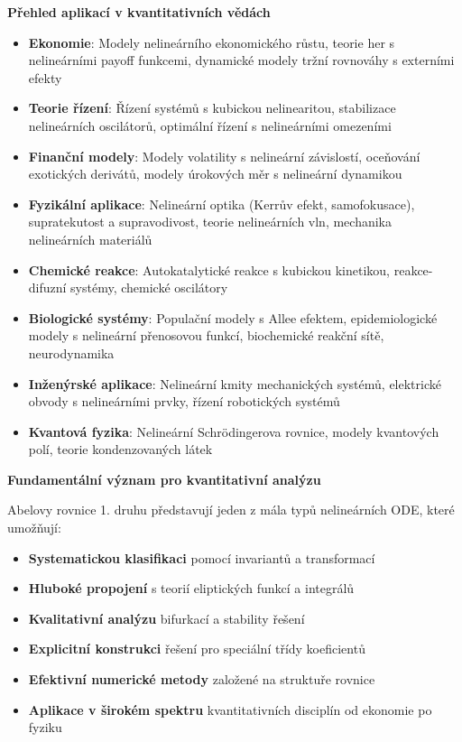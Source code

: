 \vspace{1\baselineskip}

\noindent\textbf{Přehled aplikací v kvantitativních vědách}

\begin{itemize}
\item \textbf{Ekonomie}: Modely nelineárního ekonomického růstu, teorie her s nelineárními payoff funkcemi, dynamické modely tržní rovnováhy s externími efekty
\item \textbf{Teorie řízení}: Řízení systémů s kubickou nelinearitou, stabilizace nelineárních oscilátorů, optimální řízení s nelineárními omezeními
\item \textbf{Finanční modely}: Modely volatility s nelineární závislostí, oceňování exotických derivátů, modely úrokových měr s nelineární dynamikou
\item \textbf{Fyzikální aplikace}: Nelineární optika (Kerrův efekt, samofokusace), supratekutost a supravodivost, teorie nelineárních vln, mechanika nelineárních materiálů
\item \textbf{Chemické reakce}: Autokatalytické reakce s kubickou kinetikou, reakce-difuzní systémy, chemické oscilátory
\item \textbf{Biologické systémy}: Populační modely s Allee efektem, epidemiologické modely s nelineární přenosovou funkcí, biochemické reakční sítě, neurodynamika
\item \textbf{Inženýrské aplikace}: Nelineární kmity mechanických systémů, elektrické obvody s nelineárními prvky, řízení robotických systémů
\item \textbf{Kvantová fyzika}: Nelineární Schrödingerova rovnice, modely kvantových polí, teorie kondenzovaných látek
\end{itemize}

\vspace{1\baselineskip}

\noindent\textbf{Fundamentální význam pro kvantitativní analýzu}

Abelovy rovnice 1. druhu představují jeden z mála typů nelineárních ODE, které umožňují:
\begin{itemize}
\item \textbf{Systematickou klasifikaci} pomocí invariantů a transformací
\item \textbf{Hluboké propojení} s teorií eliptických funkcí a integrálů
\item \textbf{Kvalitativní analýzu} bifurkací a stability řešení
\item \textbf{Explicitní konstrukci} řešení pro speciální třídy koeficientů
\item \textbf{Efektivní numerické metody} založené na struktuře rovnice
\item \textbf{Aplikace v širokém spektru} kvantitativních disciplín od ekonomie po fyziku
\end{itemize}

